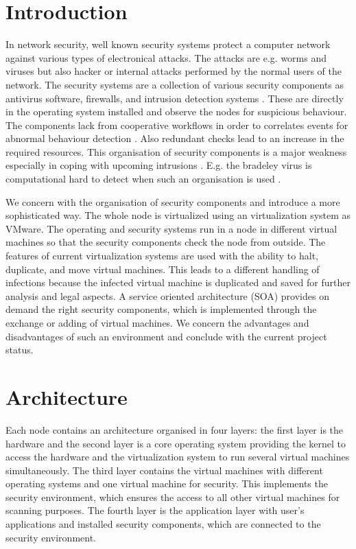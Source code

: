 \documentclass[conference,10pt,a4]{IEEEtran}
\begin{document}
\section{Introduction}
\label{secIntroduction}
In network security, well known security systems protect a computer network against various types of electronical attacks. The attacks are e.g. worms and viruses but also hacker or internal attacks performed by the normal users of the network. The security systems are a collection of various security components as antivirus software, firewalls, and intrusion detection systems \cite{Szo05}. These are directly in the operating system installed and observe the nodes for suspicious behaviour. The components lack from cooperative workflows in order to correlates events for abnormal behaviour detection \cite{Gartner07}. Also redundant checks lead to an increase in the required resources. This organisation of security components is a major weakness especially in coping with upcoming intrusions \cite{Szo01}. E.g. the bradeley virus is computational hard to detect when such an organisation is used \cite{Fil05}.

We concern with the organisation of security components and introduce a more sophisticated way. The whole node is virtualized using an virtualization system as VMware. The operating and security systems run in a node in different virtual machines so that the security components check the node from outside. The features of current virtualization systems are used with the ability to halt, duplicate, and move virtual machines. This leads to a different handling of infections because the infected virtual machine is duplicated and saved for further analysis and legal aspects. A service oriented architecture (SOA) provides on demand the right security components, which is implemented through the exchange or adding of virtual machines. We concern the advantages and disadvantages of such an environment and conclude with the current project status.

\section{Architecture}
Each node contains an architecture organised in four layers: the first layer is the hardware and the second layer is a core operating system providing the kernel to access the hardware and the virtualization system to run several virtual machines simultaneously. The third layer contains the virtual machines with different operating systems and one virtual machine for security. This implements the security environment, which ensures the access to all other virtual machines for scanning purposes. The fourth layer is the application layer with user's applications and installed security components, which are connected to the security environment. 
\end{document}
